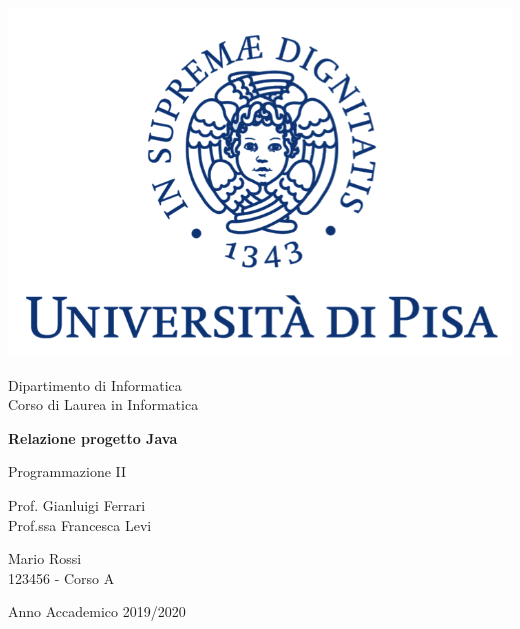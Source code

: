 \documentclass[10pt, italian, openany]{book}
\begin{document}
\begin{titlepage}
	\clearpage\thispagestyle{empty}
	\centering
	\vspace{1cm}

    \includegraphics[scale=0.60]{unipi-logo.png}
    
	{\normalsize \noindent Dipartimento di Informatica \\
	             Corso di Laurea in Informatica \par}
	
	\vspace{2cm}
	{\Huge \textbf{Relazione progetto Java} \par}
	\vspace{1cm}
	{\large Programmazione II}
	\vspace{5cm}

    \begin{minipage}[t]{0.47\textwidth}
    	{\large{ Prof. Gianluigi Ferrari\\ Prof.ssa Francesca Levi}}
    \end{minipage}\hfill\begin{minipage}[t]{0.47\textwidth}\raggedleft
    	{\large {Mario Rossi \\ 123456 - Corso A\\ }}
    \end{minipage}

    \vspace{4cm}

	{\normalsize Anno Accademico 2019/2020 \par}

	\pagebreak

\end{titlepage}
\end{document}
